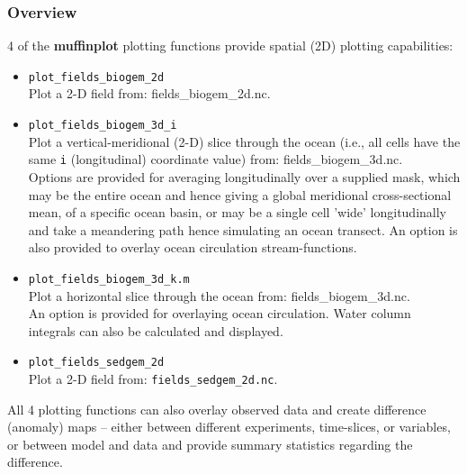 \documentclass[11pt,fleqn]{book} %
\begin{document}

\subsubsection{Overview}

4 of the \textbf{muffinplot} plotting functions provide spatial (2D) plotting capabilities:
\vspace{2mm}
\begin{itemize}

\item \texttt{plot\_fields\_biogem\_2d}
\\Plot a 2-D field from: \footnotesize\textsf{fields\_biogem\_2d.nc}\normalsize.

\item \texttt{plot\_fields\_biogem\_3d\_i}
\\Plot a vertical-meridional (2-D) slice through the ocean (i.e., all cells have the same \texttt{i} (longitudinal) coordinate value) from: \footnotesize\textsf{fields\_biogem\_3d.nc}\normalsize.
\\Options are  provided for averaging longitudinally over a supplied mask, which may be the entire ocean and hence giving a global meridional cross-sectional mean, of a specific ocean basin, or may be a single cell 'wide' longitudinally and take a meandering path hence simulating an ocean transect. An option is also provided to overlay ocean circulation stream-functions.

\item \texttt{plot\_fields\_biogem\_3d\_k.m}
\\Plot a horizontal slice through the ocean from: \footnotesize\textsf{fields\_biogem\_3d.nc}\normalsize.
\\An option is provided for overlaying ocean circulation. Water column integrals can also be calculated and displayed.

\item \texttt{plot\_fields\_sedgem\_2d}
\\Plot a 2-D field from: \texttt{fields\_sedgem\_2d.nc}.

\end{itemize}
\vspace{2mm}

All 4 plotting functions can also overlay observed data and create difference (anomaly) maps -- either between different experiments, time-slices, or variables, or between model and data and provide summary statistics regarding the difference.
\end{document}
